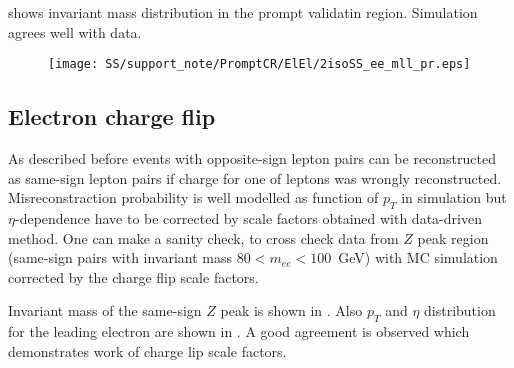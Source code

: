 \begin{table*}[htbp]
\caption{Ratio between observed and expected same-sign pairs in the $WZ$ and $ZZ$ control region for various cuts on the dielectron invariant mass. 
The uncertainties account for both statistical and systematic errors.}
\begin{center}
\end{center}
\label{tab:prompt_ratios}
\end{table*}

 shows invariant mass distribution in the prompt validatin region.
Simulation agrees well with data.

\begin{figure}[h]
\begin{center}
\texttt{[image: SS/support\_note/PromptCR/ElEl/2isoSS\_ee\_mll\_pr.eps]}
\caption{\toDo}
\label{fig:prompt_CR}
\end{center}
\end{figure} 


\subsection{Electron charge flip}

As described before events with opposite-sign lepton pairs can be reconstructed as same-sign lepton pairs if charge for one of leptons was wrongly reconstructed.
Misreconstraction probability is well modelled as function of $p_T$ in simulation 
but $\eta$-dependence have to be corrected by scale factors obtained with data-driven method.
One can make a sanity check, to cross check data from $Z$ peak region (same-sign pairs with invariant mass $80 < m_{ee} < 100$~GeV) with MC simulation corrected by the charge flip scale factors.

Invariant mass of the same-sign $Z$ peak is shown in . 
Also $p_T$ and $\eta$ distribution for the leading electron are shown in .
A good agreement is observed which demonstrates work of charge lip scale factors.

